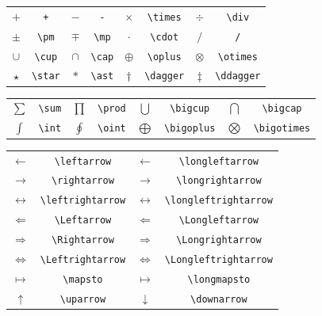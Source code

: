 \documentclass[a4paper,10pt]{article}
\begin{document}
    \begin{table}[!htbp]
        \centering
        \begin{tabular}{cccccccc}
            $+$ & \verb|+| &
            $-$ & \verb|-| &
            $\times$ & \verb|\times| &
            $\div$ & \verb|\div| \\
            $\pm$ & \verb|\pm| &
            $\mp$ & \verb|\mp| &
            $\cdot$ & \verb|\cdot| &
            $/$ & \verb|/| \\
            $\cup$ & \verb|\cup| &
            $\cap$ & \verb|\cap| &
            $\oplus$ & \verb|\oplus| &
            $\otimes$ & \verb|\otimes| \\
            $\star$ & \verb|\star| &
            $\ast$ & \verb|\ast| &
            $\dagger$ & \verb|\dagger| &
            $\ddagger$ & \verb|\ddagger| \\
        \end{tabular}
    \end{table}
    \begin{table}[!htbp]
        \centering
        \begin{tabular}{cccccccc}
            $\sum$ & \verb|\sum| &
            $\prod$ & \verb|\prod| &
            $\bigcup$ & \verb|\bigcup| &
            $\bigcap$ & \verb|\bigcap| \\
            $\int$ & \verb|\int| &
            $\oint$ & \verb|\oint| &
            $\bigoplus$ & \verb|\bigoplus| &
            $\bigotimes$ & \verb|\bigotimes| \\
        \end{tabular}
    \end{table}
    \begin{table}[!htbp]
        \centering
        \begin{tabular}{cccc}
            $\leftarrow$ & \verb|\leftarrow| &
            $\longleftarrow$ & \verb|\longleftarrow| \\
            $\rightarrow$ & \verb|\rightarrow| &
            $\longrightarrow$ & \verb|\longrightarrow| \\
            $\leftrightarrow$ & \verb|\leftrightarrow| &
            $\longleftrightarrow$ & \verb|\longleftrightarrow| \\
            $\Leftarrow$ & \verb|\Leftarrow| &
            $\Longleftarrow$ & \verb|\Longleftarrow| \\
            $\Rightarrow$ & \verb|\Rightarrow| &
            $\Longrightarrow$ & \verb|\Longrightarrow| \\
            $\Leftrightarrow$ & \verb|\Leftrightarrow| &
            $\Longleftrightarrow$ & \verb|\Longleftrightarrow| \\
            $\mapsto$ & \verb|\mapsto| &
            $\longmapsto$ & \verb|\longmapsto| \\
            $\uparrow$ & \verb|\uparrow| &
            $\downarrow$ & \verb|\downarrow| \\
        \end{tabular}
    \end{table}
\end{document}
